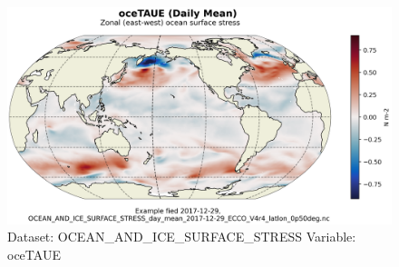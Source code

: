 \begin{figure}[H]
\centering
\includegraphics[scale=0.55]{../images/plots/latlon_plots/Ocean_and_Sea-Ice_Surface_Stress/oceTAUE.png}
\caption{Dataset: OCEAN\_AND\_ICE\_SURFACE\_STRESS Variable: oceTAUE}
\label{tab:table-OCEAN_AND_ICE_SURFACE_STRESS_oceTAUE-Plot}
\end{figure}
\pagebreak
